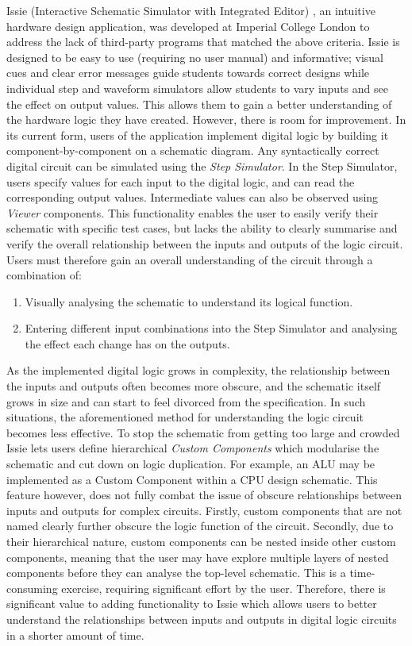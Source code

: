 Issie (Interactive Schematic Simulator with Integrated Editor) \cite{issie_repo}, an intuitive hardware design application, was developed at Imperial College London to address the lack of third-party programs that matched the above criteria. Issie is designed to be easy to use (requiring no user manual) and informative; visual cues and clear error messages guide students towards correct designs while individual step and waveform simulators allow students to vary inputs and see the effect on output values. This allows them to gain a better understanding of the hardware logic they have created. However, there is room for improvement.
In its current form, users of the application implement digital logic by building it component-by-component on a schematic diagram. Any syntactically correct digital circuit can be simulated using the \textit{Step Simulator}. In the Step Simulator, users specify values for each input to the digital logic, and can read the corresponding output values. Intermediate values can also be observed using \textit{Viewer} components. This functionality enables the user to easily verify their schematic with specific test cases, but lacks the ability to clearly summarise and verify the overall relationship between the inputs and outputs of the logic circuit. Users must therefore gain an overall understanding of the circuit through a combination of:
\begin{enumerate}
    \item Visually analysing the schematic to understand its logical function.
    \item Entering different input combinations into the Step Simulator and analysing the effect each change has on the outputs.
\end{enumerate}
As the implemented digital logic grows in complexity, the relationship between the inputs and outputs often becomes more obscure, and the schematic itself grows in size and can start to feel divorced from the specification. In such situations, the aforementioned method for understanding the logic circuit becomes less effective. To stop the schematic from getting too large and crowded Issie lets users define hierarchical \textit{Custom Components} which modularise the schematic and cut down on logic duplication. For example, an ALU may be implemented as a Custom Component within a CPU design schematic. This feature however, does not fully combat the issue of obscure relationships between inputs and outputs for complex circuits. Firstly, custom components that are not named clearly further obscure the logic function of the circuit. Secondly, due to their hierarchical nature, custom components can be nested inside other custom components, meaning that the user may have explore multiple layers of nested components before they can analyse the top-level schematic. This is a time-consuming exercise, requiring significant effort by the user. Therefore, there is significant value to adding functionality to Issie which allows users to better understand the relationships between inputs and outputs in digital logic circuits in a shorter amount of time.

